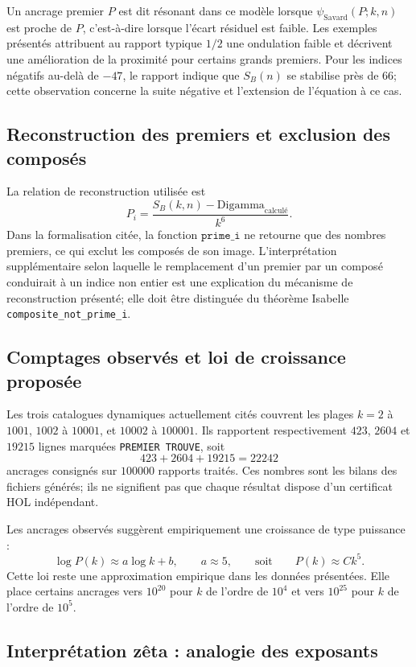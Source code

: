 \documentclass[11pt,a4paper]{article}
\begin{document}
Un ancrage premier $P$ est dit résonant dans ce modèle lorsque
$\psi_{\mathrm{Savard}}(P;k,n)$ est proche de $P$, c'est-à-dire lorsque
l'écart résiduel est faible. Les exemples présentés attribuent au rapport
typique $1/2$ une ondulation faible et décrivent une amélioration de la
proximité pour certains grands premiers. Pour les indices négatifs au-delà de
$-47$, le rapport indique que $S_B(n)$ se stabilise près de $66$; cette
observation concerne la suite négative et l'extension de l'équation à ce cas.

\subsection{Reconstruction des premiers et exclusion des composés}

La relation de reconstruction utilisée est
\[
P_i=\frac{S_B(k,n)-\mathrm{Digamma}_{\text{calculé}}}{k^6}.
\]
Dans la formalisation citée, la fonction $\texttt{prime\_i}$ ne retourne que
des nombres premiers, ce qui exclut les composés de son image. L'interprétation
supplémentaire selon laquelle le remplacement d'un premier par un composé
conduirait à un indice non entier est une explication du mécanisme de
reconstruction présenté; elle doit être distinguée du théorème Isabelle
\texttt{composite\_not\_prime\_i}.

\subsection{Comptages observés et loi de croissance proposée}

Les trois catalogues dynamiques actuellement cités couvrent les plages
$k=2$ à $1001$, $1002$ à $10001$, et $10002$ à $100001$. Ils rapportent
respectivement $423$, $2604$ et $19215$ lignes marquées
\texttt{PREMIER TROUVE}, soit
\[
423+2604+19215=22242
\]
ancrages consignés sur $100000$ rapports traités. Ces nombres sont les bilans
des fichiers générés; ils ne signifient pas que chaque résultat dispose d'un
certificat HOL indépendant.

Les ancrages observés suggèrent empiriquement une croissance de type puissance :
\[
\log P(k)\approx a\log k+b,\qquad a\approx 5,
\qquad\text{soit}\qquad P(k)\approx Ck^5.
\]
Cette loi reste une approximation empirique dans les données présentées. Elle
place certains ancrages vers $10^{20}$ pour $k$ de l'ordre de $10^4$ et vers
$10^{25}$ pour $k$ de l'ordre de $10^5$.

\subsection{Interprétation zêta : analogie des exposants}
\end{document}

